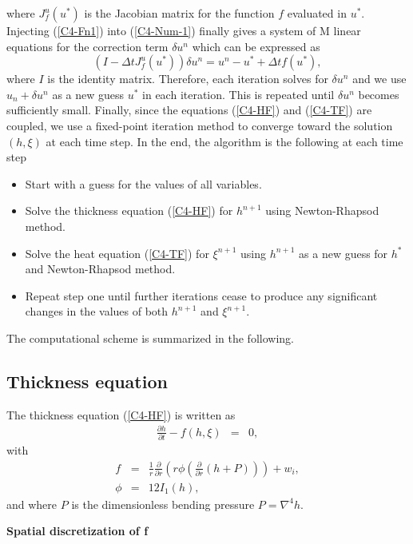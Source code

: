 where  $J^u_{f}(u^*)$ is  the  Jacobian matrix  for  the function  $f$
evaluated  in $u^*$.   Injecting (\ref{C4-Fn1})  into (\ref{C4-Num-1})
finally gives a  system of M linear equations for  the correction term
$\delta u^n$ which can be expressed as
\begin{equation}
  (I-\Delta tJ^u_{f}(u^*))\delta u^n=u^n-u^*+\Delta t f(u^*),
\end{equation}
where $I$ is the identity matrix. Therefore, each iteration solves for
$\delta u^n$ and we use $u_n+\delta u^n$  as a new guess $u^*$ in each
iteration. This  is repeated  until $\delta u^n$  becomes sufficiently
small.  Finally,  since the equations (\ref{C4-HF})  and (\ref{C4-TF})
are coupled, we use a  fixed-point iteration method to converge toward
the solution $(h,\xi)$  at each time step.  In the  end, the algorithm
is the following at each time step
\begin{itemize}
\item Start with a guess for the values of all variables.
\item Solve  the thickness equation (\ref{C4-HF})  for $h^{n+1}$ using
  Newton-Rhapsod method.
\item  Solve the  heat  equation (\ref{C4-TF})  for $\xi^{n+1}$  using
  $h^{n+1}$ as a new guess for $h^*$ and Newton-Rhapsod method.
\item Repeat  step one until  further iterations cease to  produce any
  significant changes in the values of both $h^{n+1}$ and $\xi^{n+1}$.
\end{itemize}
The computational scheme is summarized in the following.

\subsection{Thickness equation}

The thickness equation (\ref{C4-HF}) is written as
\begin{eqnarray}
  \frac{\partial h}{\partial t}-f(h,\xi)&=&0,
\end{eqnarray}
with
\begin{eqnarray}
  f& =& \frac{1}{r}
        \frac{\partial}{\partial      r}
        \left(      r  \phi\left(     \frac{\partial      }{\partial
        r}\left(h+P\right)\right)\right)+w_i,\\
  \phi &=& 12I_1(h),
\end{eqnarray}
and where $P$ is the dimensionless bending pressure $P = \nabla^4h$.

\vspace{.5cm} \textbf{Spatial discretization of f} \vspace{.5cm}

